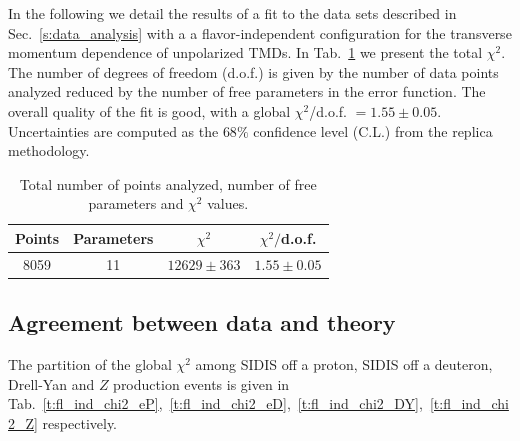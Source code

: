 \documentclass[aps,preprintnumbers,showpacs,nofootinbib,superscriptaddress,floatfix]{revtex4}
\newcommand{\AS}[1]{{\textcolor[rgb]{1,0,1}{#1}}}
\begin{document}
In the following we detail the results of a fit to the data sets described in Sec.~\ref{s:data_analysis} with a a flavor-independent configuration for the transverse momentum dependence of unpolarized TMDs.
In Tab.~\ref{t:fl_ind_chi2} we present the total $\chi^2$. The number of degrees of freedom (d.o.f.) is given by the number of data points analyzed reduced by the number of free parameters in the error function. 
The overall quality of the fit is good, with a global $\chi^2$/d.o.f. $= 1.55 \pm 0.05$. Uncertainties are computed as the $68\%$ confidence level (C.L.) from the replica methodology. 
\begin{table}[h!]
\small
  \centering
  \begin{tabular}{|c|c|c|c|}
\hline
\hline
Points& Parameters & $\chi^2$& $\chi^2/$d.o.f. \\
\hline
8059 & 11  & $12629 \pm 363$ & $1.55 \pm 0.05$ \\
\hline
\hline
\end{tabular}
\caption{Total number of points analyzed, number of free parameters and $\chi^2$ values.}
\label{t:fl_ind_chi2}
\end{table}



\subsection{Agreement between data and theory}
\label{ss:data_vs_theory}

The partition of the global $\chi^2$ among SIDIS off \AS{a} proton, SIDIS off \AS{a} deuteron, Drell-Yan and $Z$ production events is given in Tab.~\ref{t:fl_ind_chi2_eP},~\ref{t:fl_ind_chi2_eD},~\ref{t:fl_ind_chi2_DY},~\ref{t:fl_ind_chi2_Z} respectively. 
\end{document}
